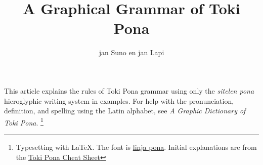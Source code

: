 \documentclass{article}
\title{A Graphical Grammar of Toki Pona \\[1ex]{\tp{nasin toki sitelen pi toki+pona}}}
\author{jan Suno en jan Lapi}
\begin{document}
\maketitle
This article explains the rules of Toki Pona grammar
using only the \textit {sitelen pona} hieroglyphic
writing system in examples.  For help with the pronunciation,
definition, and spelling using the Latin alphabet, see
\textit {A Graphic Dictionary of Toki Pona}.
\footnote{Typesetting with LaTeX.  The font is
  \href{http://musilili.net/linja-pona/}{linja pona}.
  Initial explanations are from the
  \href{https://blinry.org/toki-pona-cheat-sheet}{Toki
    Pona Cheat Sheet}}

\newenvironment{ex}{
  \begin{adjustwidth}{0.5cm}{}}{\end{adjustwidth}}
\end{document}
